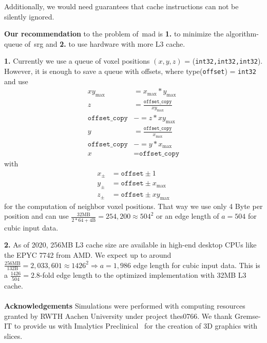 \documentclass{article}
\begin{document}
Additionally, we would need guarantees that cache instructions can not be silently ignored.
\par
\textbf{Our recommendation} to the problem of~\ac{mad} is \textbf{1.} to minimize the algorithm-queue of~\ac{srg} and \textbf{2.} to use hardware with more L3 cache.\par
  \textbf{1.} Currently we use a queue of voxel positions $(x,y,z)$ = (\texttt{int32,int32,int32}).
  However, it is enough to save a queue with offsets, where type(\texttt{offset}) = \texttt{int32} and use
  \begin{align}
    xy_\text{max} &= x_\text{max}*y_\text{max}\\
    z &= \frac{\texttt{offset\_copy}}{xy_\text{max}}\\
    \texttt{offset\_copy} &-= z*xy_\text{max}\\
    y &= \frac{\texttt{offset\_copy}}{x_\text{max}}\\
    \texttt{offset\_copy} &-= y*x_\text{max}\\
    x &= \texttt{offset\_copy}
  \end{align}
  with
  \begin{align}
    x_{\pm} &= \texttt{offset} \pm 1\\
    y_{\pm} &= \texttt{offset} \pm x_\text{max}\\
    z_{\pm} &= \texttt{offset} \pm xy_\text{max}
  \end{align}
  for the computation of neighbor voxel positions.
  That way we use only 4 Byte per position and can use $\frac{32\text{MB}}{2*64+4\text{B}} = 254,200\approx 504^2$ or an edge length of $a=504$ for cubic input data.\par
  \textbf{2.} As of 2020, 256MB L3 cache size are available in high-end desktop CPUs like the EPYC 7742 from AMD. 
  We expect up to around $\frac{256\text{MB}}{132\text{B}} = 2,033,601 \approx 1426^2 \Rightarrow a=1,986$ edge length for cubic input data.
  This is a $\frac{1426}{504} = 2.8$-fold edge length to the optimized implementation with 32MB L3 cache.
\\
\\
\textbf{Acknowledgements}
Simulations were performed with computing resources granted by RWTH Aachen University under project thes0766.
We thank Gremse-IT to provide us with Imalytics Preclinical~\cite{gremse2016} for the creation of 3D graphics with slices.

\printbibliography{}
\end{document}
